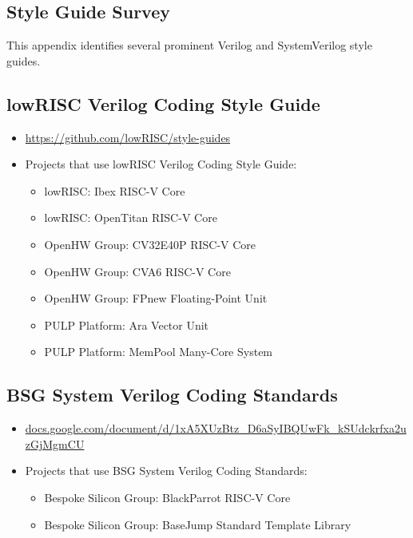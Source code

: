 \begin{appendices}
\chapter{Style Guide Survey}
\label{appx:style_guides}

This appendix identifies several prominent Verilog and SystemVerilog style guides.

\section{lowRISC Verilog Coding Style Guide}

\begin{itemize}
    \item \url{https://github.com/lowRISC/style-guides} \cite{lowRISCstyleguides}
    \item Projects that use lowRISC Verilog Coding Style Guide:
    \begin{itemize}
        \item lowRISC: Ibex RISC-V Core \cite{Ibex}
        \item lowRISC: OpenTitan RISC-V Core \cite{OpenTitan}
        \item OpenHW Group: CV32E40P RISC-V Core \cite{cv32e40p}
        \item OpenHW Group: CVA6 RISC-V Core \cite{cva6}
        \item OpenHW Group: FPnew Floating-Point Unit \cite{cvfpu}
        \item PULP Platform: Ara Vector Unit \cite{Ara}
        \item PULP Platform: MemPool Many-Core System \cite{MemPool}
    \end{itemize}
\end{itemize}

\pagebreak

\section{BSG System Verilog Coding Standards}

\begin{itemize}
    \item \href{https://docs.google.com/document/d/1xA5XUzBtz_D6aSyIBQUwFk_kSUdckrfxa2uzGjMgmCU}{\footnotesize docs.google.com/document/d/1xA5XUzBtz\_D6aSyIBQUwFk\_kSUdckrfxa2uzGjMgmCU} \cite{BSGstyleguide}
    \item Projects that use BSG System Verilog Coding Standards:
    \begin{itemize}
        \item Bespoke Silicon Group: BlackParrot RISC-V Core \cite{blackparrot}
        \item Bespoke Silicon Group: BaseJump Standard Template Library \cite{basejumpstl}
    \end{itemize}
\end{itemize}


\end{appendices}
